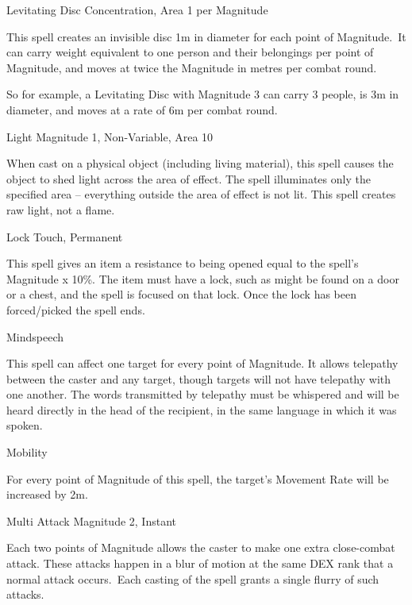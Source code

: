 \begin{rpg-spell}
{Levitating Disc}
{Concentration, Area 1 per Magnitude}

This spell creates an invisible disc 1m in diameter for each point of Magnitude. It can carry weight equivalent to one person and their belongings per point of Magnitude, and moves at twice the Magnitude in metres per combat round.

So for example, a Levitating Disc with Magnitude 3 can carry 3 people, is 3m in diameter, and moves at a rate of 6m per combat round.
\end{rpg-spell}


\begin{rpg-spell}
{Light}
{Magnitude 1, Non-Variable, Area 10}

When cast on a physical object (including living material), this spell causes the object to shed light across the area of effect. The spell illuminates only the specified area – everything outside the area of effect is not lit. This spell creates raw light, not a flame.
\end{rpg-spell}


\begin{rpg-spell}
{Lock}
{Touch, Permanent}

This spell gives an item a resistance to being opened equal to the spell’s Magnitude x 10\%. The item must have a lock, such as might be found on a door or a chest, and the spell is focused on that lock. Once the lock has been forced/picked the spell ends.
\end{rpg-spell}


\begin{rpg-spell}
{Mindspeech}
{}

This spell can affect one target for every point of Magnitude. It allows telepathy between the caster and any target, though targets will not have telepathy with one another. The words transmitted by telepathy must be whispered and will be heard directly in the head of the recipient, in the same language in which it was spoken. 
\end{rpg-spell}


\begin{rpg-spell}
{Mobility}
{}

For every point of Magnitude of this spell, the target’s Movement Rate will be increased by 2m.
\end{rpg-spell}


\begin{rpg-spell}
{Multi Attack}
{Magnitude 2, Instant}

Each two points of Magnitude allows the caster to make one extra close-combat attack. These attacks happen in a blur of motion at the same DEX rank that a normal attack occurs. Each casting of the spell grants a single flurry of such attacks.
\end{rpg-spell}


